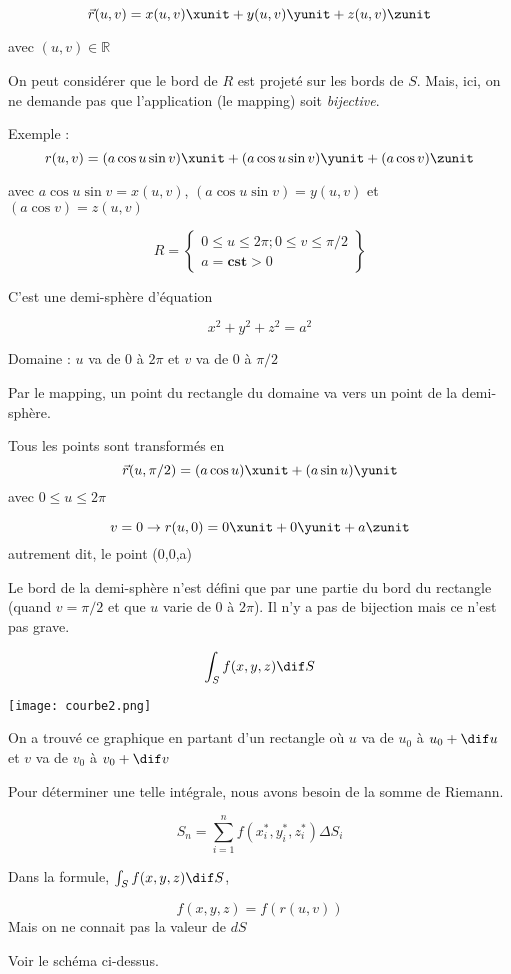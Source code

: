 \[\vec r(u,v)=x(u,v)\xunit +y(u,v)\yunit +z(u,v)\zunit\]

avec $(u,v)\in \mathbb{R}$

On peut considérer que le bord de $R$ est projeté sur les bords de $S$. Mais, ici, on ne demande pas que l'application (le mapping) soit \emph{bijective}.

Exemple : \[r(u,v) = (a \cos u \sin v) \xunit + (a \cos u \sin v) \yunit +(a \cos v) \zunit\]

avec $a \cos u \sin v = x(u,v)$, $(a \cos u \sin v)=y(u,v)$ et $(a \cos v) =z(u,v)$

\[
R=
\left\{
\begin{array}{c}
0\leq u \leq 2 \pi ; 0\leq v\leq \pi /2\\

a = \textbf{cst} > 0
\end{array}
\right\}
\]

C'est une demi-sphère d'équation

\[x^2+y^2+z^2 = a^2\]

Domaine :
$u$ va de $0$ à $2\pi$ et $v$ va de 0 à $\pi /2$

Par le mapping, un point du rectangle du domaine va vers un point de la demi-sphère.

Tous les points sont transformés en \[\vec r (u,\pi/2 ) = (a \cos u  )\xunit + (a \sin u )\yunit \] avec $0\leq u \leq 2 \pi $

\[v=0 \to r(u,0) = 0 \xunit + 0 \yunit + a \zunit\] autrement dit, le point (0,0,a)


Le bord de la demi-sphère n'est défini que par une partie du bord du rectangle (quand $v=\pi/2$ et que $u$ varie de $0$ à $2\pi$).
Il n'y a pas de bijection mais ce n'est pas grave.


\[\int_S f(x,y,z)\dif S\]

\texttt{[image: courbe2.png]}

On a trouvé ce graphique en partant d'un rectangle où $u$ va de $u_0$ à $u_0 + \dif u$ et $v$ va de $v_0$ à $v_0+\dif v$

Pour déterminer une telle intégrale, nous avons besoin de la somme de Riemann.

\[S_n = \sum_{i=1}^nf(x_i^*,y_i^*,z_i^*) \Delta S_i\]

Dans la formule, $\int_S f(x,y,z)\dif S$,

\[f(x,y,z)=f(r(u,v))\] Mais on ne connait pas la valeur de $dS$

Voir le schéma ci-dessus.

